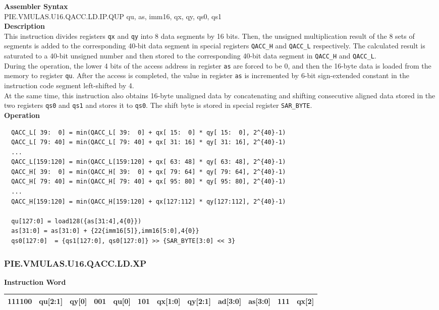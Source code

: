 \textbf{Assembler Syntax} \\
PIE.VMULAS.U16.QACC.LD.IP.QUP qu, as, imm16, qx, qy, qs0, qs1 \\
\textbf{Description} \\
This instruction divides registers \lstinline{qx} and \lstinline{qy} into 8 data segments by 16 bits. Then, the unsigned multiplication result of the 8 sets of segments is added to the corresponding 40-bit data segment in special registers \lstinline{QACC_H} and \lstinline{QACC_L} respectively. The calculated result is saturated to a 40-bit unsigned number and then stored to the corresponding 40-bit data segment in \lstinline{QACC_H} and \lstinline{QACC_L}.\\
During the operation, the lower 4 bits of the access address in register \lstinline{as} are forced to be 0, and then the 16-byte data is loaded from the memory to register \lstinline{qu}. After the access is completed, the value in register \lstinline{as} is incremented by 6-bit sign-extended constant in the instruction code segment left-shifted by 4.\\
At the same time, this instruction also obtains 16-byte unaligned data by concatenating and shifting consecutive aligned data stored in the two registers \lstinline{qs0} and \lstinline{qs1} and stores it to \lstinline{qs0}. The shift byte is stored in special register \lstinline{SAR_BYTE}.\\
\textbf{Operation}
\begin{lstlisting}
  QACC_L[ 39:  0] = min(QACC_L[ 39:  0] + qx[ 15:  0] * qy[ 15:  0], 2^{40}-1)
  QACC_L[ 79: 40] = min(QACC_L[ 79: 40] + qx[ 31: 16] * qy[ 31: 16], 2^{40}-1)
  ...
  QACC_L[159:120] = min(QACC_L[159:120] + qx[ 63: 48] * qy[ 63: 48], 2^{40}-1)
  QACC_H[ 39:  0] = min(QACC_H[ 39:  0] + qx[ 79: 64] * qy[ 79: 64], 2^{40}-1)
  QACC_H[ 79: 40] = min(QACC_H[ 79: 40] + qx[ 95: 80] * qy[ 95: 80], 2^{40}-1)
  ...
  QACC_H[159:120] = min(QACC_H[159:120] + qx[127:112] * qy[127:112], 2^{40}-1)

  qu[127:0] = load128({as[31:4],4{0}})
  as[31:0] = as[31:0] + {22{imm16[5]},imm16[5:0],4{0}}
  qs0[127:0]  = {qs1[127:0], qs0[127:0]} >> {SAR_BYTE[3:0] << 3}
\end{lstlisting}

\newpage
\subsubsection{PIE.VMULAS.U16.QACC.LD.XP}\label{instruction:PIEVMULASU16QACCLDXP}
\setlength\tabcolsep{6pt}
\textbf{Instruction Word} \\
\begin{tabular}{|c|c|c|c|c|c|c|c|c|c|c|c|}
	\hline
	111100 & qu[2:1] & qy[0] & 001 & qu[0] & 101 & qx[1:0] & qy[2:1] & ad[3:0] & as[3:0] & 111 & qx[2] \\
	\hline
\end{tabular}

